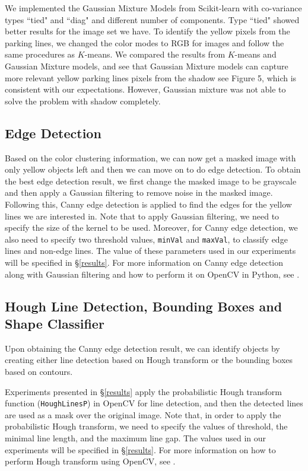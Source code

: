 \documentclass{m2pi}
\begin{document}
We implemented the Gaussian Mixture Models from Scikit-learn with co-variance types ``tied" and ``diag" and different number of components. Type ``tied" showed better results for the image set we have. To identify the yellow pixels from the parking lines, we changed the color modes to RGB for images and follow the same procedures as $K$-means.  We compared the results from $K$-means and Gaussian Mixture models, and see that Gaussian Mixture models can capture more relevant yellow parking lines pixels from the shadow see Figure 5, which is consistent with our expectations. However, Gaussian mixture was not able to solve the problem with shadow completely.  


\subsection{Edge Detection}
Based on the color clustering information, we can now get a masked image 
with only yellow objects left and then we can move on to do edge detection. 
To obtain the best edge 
detection result, we first change the masked image to be grayscale and 
then apply a Gaussian filtering \cite[\S 3.1]{Szeliski}
to remove noise in the masked image. 
Following this, Canny edge detection \cite{canny} is applied to 
find the edges for the 
yellow lines we are interested in. Note that to apply Gaussian filtering,
we need to specify the size of the kernel to be used. Moreover, for Canny edge
detection, we also need to specify two threshold values, \verb+minVal+ and \verb+maxVal+, 
to classify edge lines and non-edge lines. The value 
of these parameters used in our experiments will be specified 
in \S \ref{results}.
For more information on Canny edge detection
along with Gaussian filtering and how to perform it on OpenCV in Python, 
see \cite{opencvt}.


\subsection{Hough Line Detection, Bounding Boxes and Shape Classifier}\label{lineandbox}
Upon obtaining the Canny edge detection result, we can identify objects by creating either line detection based on Hough transform \cite[\S 7.4.2]{Szeliski} 
or the bounding boxes based on contours.  

Experiments presented in \S \ref{results} apply the probabilistic 
Hough transform function (\verb+HoughLinesP+) \cite{Matas} in OpenCV for line detection, and then
the detected lines are used as a mask over the original image. Note that, in order to apply 
the probabilistic Hough transform, we need to specify the values of threshold, 
the minimal line length, and the maximum line gap. The values used in our
experiments will be specified in \S \ref{results}. For more information on how
to perform Hough transform using OpenCV, see \cite{opencvt}.
\end{document}

